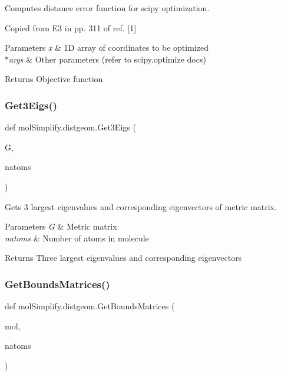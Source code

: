 Computes distance error function for scipy optimization. 

Copied from E3 in pp. 311 of ref. \mbox{[}1\mbox{]} 
\begin{DoxyParams}{Parameters}
{\em x} & 1D array of coordinates to be optimized \\
\hline
{\em $\ast$args} & Other parameters (refer to scipy.\+optimize docs) \\
\hline
\end{DoxyParams}
\begin{DoxyReturn}{Returns}
Objective function 
\end{DoxyReturn}
\mbox{\label{namespacemolSimplify_1_1distgeom_a2a9f4b671337bde3a1a15d9adef28959}} 
\subsubsection{\texorpdfstring{Get3\+Eigs()}{Get3Eigs()}}
{\footnotesize\ttfamily def mol\+Simplify.\+distgeom.\+Get3\+Eigs (\begin{DoxyParamCaption}\item[{}]{G,  }\item[{}]{natoms }\end{DoxyParamCaption})}



Gets 3 largest eigenvalues and corresponding eigenvectors of metric matrix. 


\begin{DoxyParams}{Parameters}
{\em G} & Metric matrix \\
\hline
{\em natoms} & Number of atoms in molecule \\
\hline
\end{DoxyParams}
\begin{DoxyReturn}{Returns}
Three largest eigenvalues and corresponding eigenvectors 
\end{DoxyReturn}
\mbox{\label{namespacemolSimplify_1_1distgeom_a96dab17a0c3b3ca663bcbc695f46d1b4}} 
\subsubsection{\texorpdfstring{Get\+Bounds\+Matrices()}{GetBoundsMatrices()}}
{\footnotesize\ttfamily def mol\+Simplify.\+distgeom.\+Get\+Bounds\+Matrices (\begin{DoxyParamCaption}\item[{}]{mol,  }\item[{}]{natoms }\end{DoxyParamCaption})}



